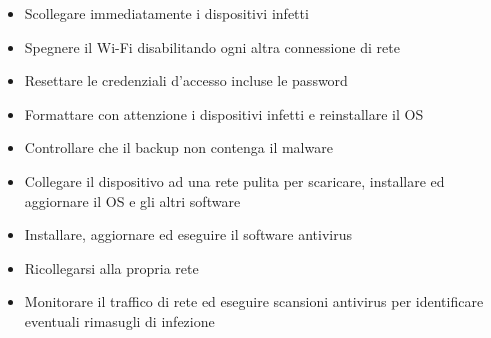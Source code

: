 \begin{itemize}[noitemsep]
    \item Scollegare immediatamente i dispositivi infetti
    \item Spegnere il Wi-Fi disabilitando ogni altra connessione di rete
    \item Resettare le credenziali d'accesso incluse le password
    \item Formattare con attenzione i dispositivi infetti e reinstallare il \acrshort{OS}
    \item Controllare che il backup non contenga il malware
    \item Collegare il dispositivo ad una rete pulita per scaricare, installare ed aggiornare il \acrshort{OS} e gli altri software
    \item Installare, aggiornare ed eseguire il software antivirus
    \item Ricollegarsi alla propria rete
    \item Monitorare il traffico di rete ed eseguire scansioni antivirus per identificare eventuali rimasugli di infezione
\end{itemize}

